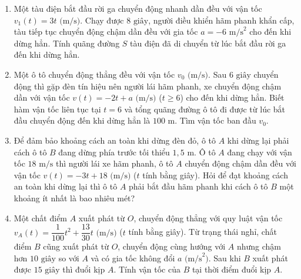 \documentclass[12pt]{article}
\begin{document}
	\begin{btdo}
		\begin{enumerate}[label=\textbf{Bài \arabic*.}]
			\item Một tàu điện bắt đầu rời ga chuyển động nhanh dần đều với vận tốc $v_1(t) = 3t\text{ (m/s)}$. Chạy được $8\text{ giây}$, người điều khiển hãm phanh khẩn cấp, tàu tiếp tục chuyển động chậm dần đều với gia tốc $a = -6\text{ m/s}^2$ cho đến khi dừng hẳn. Tính quãng đường $S$ tàu điện đã di chuyển từ lúc bắt đầu rời ga đến khi dừng hẳn.
			\item Một ô tô chuyển động thẳng đều với vận tốc $v_0\text{ (m/s)}$. Sau $6\text{ giây}$ chuyển động thì gặp đèn tín hiệu nên người lái hãm phanh, xe chuyển động chậm dần với vận tốc $v(t) = -2t + a\text{ (m/s)}$ ($t \ge 6$) cho đến khi dừng hẳn. Biết hàm vận tốc liên tục tại $t = 6$ và tổng quãng đường ô tô đi được từ lúc bắt đầu chuyển động đến khi dừng hẳn là $100\text{ m}$. Tìm vận tốc ban đầu $v_0$.
			\item Để đảm bảo khoảng cách an toàn khi dừng đèn đỏ, ô tô $A$ khi dừng lại phải cách ô tô $B$ đang dừng phía trước tối thiểu $1{,}5\text{ m}$. Ô tô $A$ đang chạy với vận tốc $18\text{ m/s}$ thì người lái xe hãm phanh, ô tô $A$ chuyển động chậm dần đều với vận tốc $v(t) = -3t + 18\text{ (m/s)}$ ($t$ tính bằng giây). Hỏi để đạt khoảng cách an toàn khi dừng lại thì ô tô $A$ phải bắt đầu hãm phanh khi cách ô tô $B$ một khoảng ít nhất là bao nhiêu mét?
			\item Một chất điểm $A$ xuất phát từ $O$, chuyển động thẳng với quy luật vận tốc $v_A(t) = \dfrac{1}{100}t^2 + \dfrac{13}{30}t\text{ (m/s)}$ ($t$ tính bằng giây). Từ trạng thái nghỉ, chất điểm $B$ cũng xuất phát từ $O$, chuyển động cùng hướng với $A$ nhưng chậm hơn $10\text{ giây}$ so với $A$ và có gia tốc không đổi $a\text{ (m/s}^2\text{)}$. Sau khi $B$ xuất phát được $15\text{ giây}$ thì đuổi kịp $A$. Tính vận tốc của $B$ tại thời điểm đuổi kịp $A$.
		\end{enumerate}
	\end{btdo}
	
\end{document}
